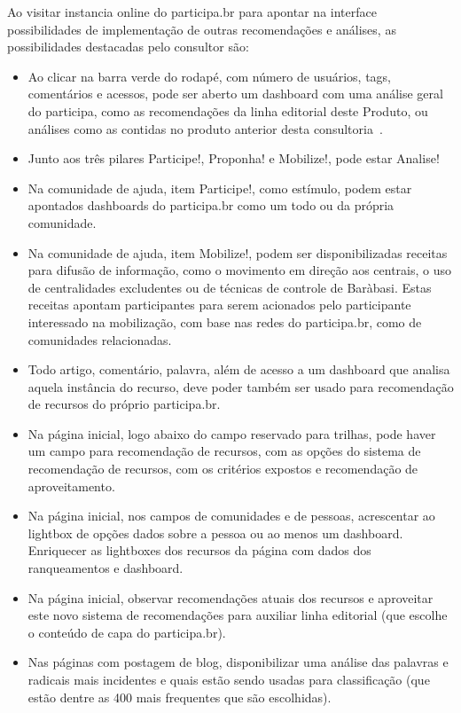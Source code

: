 \documentclass[12pt]{article}
\begin{document}
Ao visitar instancia online do participa.br para apontar na interface possibilidades de implementação de outras recomendações e análises, as possibilidades destacadas pelo consultor são:
\begin{itemize}
    \item Ao clicar na barra verde do rodapé, com número de usuários, tags, comentários e acessos, pode ser aberto um dashboard com uma análise geral do participa, como as recomendações da linha editorial deste Produto, ou análises como as contidas no produto anterior desta consultoria~\cite{repoProd3}.
    \item Junto aos três pilares Participe!, Proponha! e Mobilize!, pode estar Analise!
    \item Na comunidade de ajuda, item Participe!, como estímulo, podem estar apontados dashboards do participa.br como um todo ou da própria comunidade.
    \item Na comunidade de ajuda, item Mobilize!, podem ser disponibilizadas receitas para difusão de informação, como o movimento em direção aos centrais, o uso de centralidades excludentes ou de técnicas de controle de Baràbasi. Estas receitas apontam participantes para serem acionados pelo participante interessado na mobilização, com base nas redes do participa.br, como de comunidades relacionadas.
    \item Todo artigo, comentário, palavra, além de acesso a um dashboard que analisa aquela instância do recurso, deve poder também ser usado para recomendação de recursos do próprio participa.br.
    \item Na página inicial, logo abaixo do campo reservado para trilhas, pode haver um campo para recomendação de recursos, com as opções do sistema de recomendação de recursos, com os critérios expostos e recomendação de aproveitamento.
    \item Na página inicial, nos campos de comunidades e de pessoas, acrescentar ao lightbox de opções dados sobre a pessoa ou ao menos um dashboard. Enriquecer as lightboxes dos recursos da página com dados dos ranqueamentos e dashboard.
    \item Na página inicial, observar recomendações atuais dos recursos e aproveitar este novo sistema de recomendações para auxiliar linha editorial (que escolhe o conteúdo de capa do participa.br).
    \item Nas páginas com postagem de blog, disponibilizar uma análise das palavras e radicais mais incidentes e quais estão sendo usadas para classificação (que estão dentre as 400 mais frequentes que são escolhidas).
\end{itemize}
\end{document}
